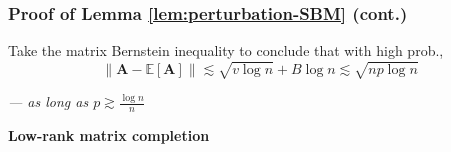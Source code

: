 \documentclass[compress,
mathserif,wide,%
]{beamer}
\begin{document}
\begin{frame}
	\frametitle{Proof of Lemma \ref{lem:perturbation-SBM} (cont.)}
		
Take the matrix Bernstein inequality to conclude that with high prob.,
%
\begin{equation*}
	\|\bm{A}-\mathbb{E}[\bm{A}]\|\lesssim\sqrt{v\log n}+B\log n\lesssim \sqrt{np\log n} 
\end{equation*}

{\hfill \em --- as long as $p \gtrsim \frac{\log n}{n}$}
\end{frame}



\begin{frame}[plain]
	\vfill
	\centering
	\Large \bf Low-rank matrix completion
	\vfill
\end{frame}
\end{document}
